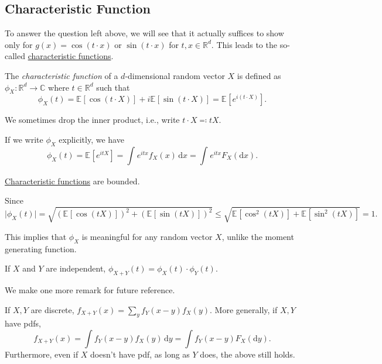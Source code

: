 \subsection{Characteristic Function}
To answer the question left above, we will see that it actually suffices to show only for \(g(x) = \cos (t\cdot x)\) or \(\sin (t\cdot x)\) for \(t, x\in \mathbb{R} ^d\). This leads to the so-called \hyperref[def:characteristic-function]{characteristic functions}.

\begin{definition}\label{def:characteristic-function}
	The \emph{characteristic function} of a \(d\)-dimensional random vector \(X\) is defined as \(\phi _X \colon \mathbb{R} ^d \to \mathbb{C} \) where \(t\in \mathbb{R} ^d\) such that
	\[
		\phi _X(t) = \mathbb{E}_{}[\cos (t \cdot X)] + i \mathbb{E}_{}[\sin (t \cdot X)] = \mathbb{E}_{}[e^{i (t \cdot X)}] .
	\]
\end{definition}

\begin{notation}
	We sometimes drop the inner product, i.e., write \(t\cdot X \eqqcolon t X\).
\end{notation}

If we write \(\phi _X\) explicitly, we have
\[
	\phi _X(t)
	= \mathbb{E}_{}[e^{i t X}]
	= \int_{}^{} e^{i t x} f_X(x)\,\mathrm{d}x
	= \int_{}^{} e^{i t x} F_X(\mathrm{d} x).
\]

\begin{remark}
	\hyperref[def:characteristic-function]{Characteristic functions} are bounded.
\end{remark}
\begin{explanation}
	Since
	\[
		\vert \phi _X(t) \vert
		= \sqrt{\left( \mathbb{E}_{}[\cos (t X)] \right)^2 + \left( \mathbb{E}_{}[\sin (t X)] \right)^2 }
		\leq \sqrt{\mathbb{E}_{}[\cos ^2(t X)] + \mathbb{E}_{}[\sin ^2(t X)] }
		= 1.
	\]
\end{explanation}

This implies that \(\phi _X\) is meaningful for any random vector \(X\), unlike the moment generating function.

\begin{remark}
	If \(X\) and \(Y\) are independent, \(\phi _{X + Y}(t) = \phi _X(t) \cdot \phi _Y(t)\).
\end{remark}

We make one more remark for future reference.

\begin{remark}\label{rmk:pdf-of-X+Y}
	If \(X, Y\) are discrete, \(f_{X + Y} (x) = \sum_{y} f_Y(x - y) f_X(y)\). More generally, if \(X, Y\) have pdfs,
	\[
		f_{X + Y}(x) = \int f_Y(x - y) f_X(y) \,\mathrm{d} y = \int f_Y(x - y) F_X(\mathrm{d} y) .
	\]
	Furthermore, even if \(X\) doesn't have pdf, as long as \(Y\) does, the above still holds.
\end{remark}

